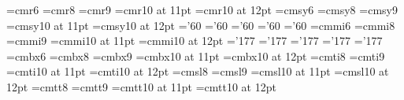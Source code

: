 \font\sixrm=cmr6
\font\eightrm=cmr8
\font\ninerm=cmr9
\font\elevenrm=cmr10 at 11pt
\font\twelverm=cmr10 at 12pt
\font\sixsy=cmsy6
\font\eightsy=cmsy8
\font\ninesy=cmsy9
\font\elevensy=cmsy10 at 11pt
\font\twelvesy=cmsy10 at 12pt
\skewchar\ninesy='60 \skewchar\eightsy='60 \skewchar\sixsy='60
\skewchar\elevensy='60
\skewchar\twelvesy='60
\font\sixi=cmmi6
\font\eighti=cmmi8
\font\ninei=cmmi9
\font\eleveni=cmmi10 at 11pt
\font\twelvei=cmmi10 at 12pt
\skewchar\ninei='177 \skewchar\eighti='177 \skewchar\sixi='177
\skewchar\eleveni='177
\skewchar\twelvei='177
\font\sixbf=cmbx6
\font\eightbf=cmbx8
\font\ninebf=cmbx9
\font\elevenbf=cmbx10 at 11pt
\font\twelvebf=cmbx10 at 12pt
\font\eightit=cmti8
\font\nineit=cmti9
\font\elevenit=cmti10 at 11pt
\font\twelveit=cmti10 at 12pt
\font\eightsl=cmsl8
\font\ninesl=cmsl9
\font\elevensl=cmsl10 at 11pt
\font\twelvesl=cmsl10 at 12pt
\font\eighttt=cmtt8
\font\ninett=cmtt9
\font\eleventt=cmtt10 at 11pt
\font\twelvett=cmtt10 at 12pt
\let\sc=\eightrm		%
\let\pt=\tt			%
\hyphenchar{} %
\hyphenchar{}
\hyphenchar{}
\hyphenchar{}
\hyphenchar{}

\newskip\ttglue		%
\def\twelvepoint{\def\rm{\fam0\twelverm}%
  \textfont0=\twelverm \scriptfont0=\ninerm \scriptscriptfont0=\sevenrm
  \textfont1=\twelvei \scriptfont1=\ninei \scriptscriptfont1=\seveni
  \textfont2=\twelvesy \scriptfont2=\ninesy \scriptscriptfont2=\sevensy
  \textfont3=\tenex \scriptfont3=\tenex \scriptscriptfont3=\tenex
  \def\it{\fam\itfam\twelveit}%
  \textfont\itfam=\twelveit
  \def\sl{\fam\slfam\twelvesl}%
  \textfont\slfam=\twelvesl
  \def\bf{\fam\bffam\twelvebf}%
  \textfont\bffam=\twelvebf \scriptfont\bffam=\ninebf
   \scriptscriptfont\bffam=\sevenbf
  \def\tt{\fam\ttfam\twelvett}%
  \textfont\ttfam=\twelvett
  \tt \ttglue=.5em plus.25em minus.15em
  \normalbaselineskip=14pt
  \let\sc=\tenrm
  \let\big=\twelvebig
  \setbox\strutbox=\hbox{\vrule height9.5pt depth4.5pt width\z@}%
  \normalbaselines\rm}

\def\elevenpoint{\def\rm{\fam0\elevenrm}%
  \textfont0=\elevenrm \scriptfont0=\eightrm \scriptscriptfont0=\sixrm
  \textfont1=\eleveni \scriptfont1=\eighti \scriptscriptfont1=\sixi
  \textfont2=\elevensy \scriptfont2=\eightsy \scriptscriptfont2=\sixsy
  \textfont3=\tenex \scriptfont3=\tenex \scriptscriptfont3=\tenex
  \def\it{\fam\itfam\elevenit}%
  \textfont\itfam=\elevenit
  \def\sl{\fam\slfam\elevensl}%
  \textfont\slfam=\elevensl
  \def\bf{\fam\bffam\elevenbf}%
  \textfont\bffam=\elevenbf \scriptfont\bffam=\eightbf
   \scriptscriptfont\bffam=\sixbf
  \def\tt{\fam\ttfam\eleventt}%
  \textfont\ttfam=\eleventt
  \tt \ttglue=.5em plus.25em minus.15em
  \normalbaselineskip=13pt
  \let\sc=\eightrm
  \let\big=\elevenbig
  \setbox\strutbox=\hbox{\vrule height9.0pt depth4.0pt width\z@}%
  \normalbaselines\rm}

